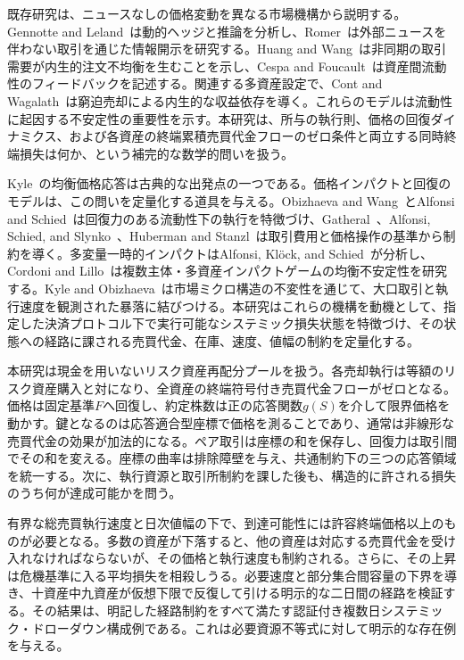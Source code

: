 \documentclass[11pt]{article}
\numberwithin{equation}{section}
\theoremstyle{definition}
\theoremstyle{remark}
\begin{document}
既存研究は、ニュースなしの価格変動を異なる市場機構から説明する。Gennotte and Leland~\citep{GennotteLeland1990}は動的ヘッジと推論を分析し、Romer~\citep{Romer1993}は外部ニュースを伴わない取引を通じた情報開示を研究する。Huang and Wang~\citep{HuangWang2009}は非同期の取引需要が内生的注文不均衡を生むことを示し、Cespa and Foucault~\citep{CespaFoucault2014}は資産間流動性のフィードバックを記述する。関連する多資産設定で、Cont and Wagalath~\citep{ContWagalath2013}は窮迫売却による内生的な収益依存を導く。これらのモデルは流動性に起因する不安定性の重要性を示す。本研究は、所与の執行則、価格の回復ダイナミクス、および各資産の終端累積売買代金フローのゼロ条件と両立する同時終端損失は何か、という補完的な数学的問いを扱う。

Kyle~\citep{Kyle1985}の均衡価格応答は古典的な出発点の一つである。価格インパクトと回復のモデルは、この問いを定量化する道具を与える。Obizhaeva and Wang~\citep{ObizhaevaWang2013}とAlfonsi and Schied~\citep{AlfonsiSchied2010}は回復力のある流動性下の執行を特徴づけ、Gatheral~\citep{Gatheral2010}、Alfonsi, Schied, and Slynko~\citep{AlfonsiSchiedSlynko2012}、Huberman and Stanzl~\citep{HubermanStanzl2004}は取引費用と価格操作の基準から制約を導く。多変量一時的インパクトはAlfonsi, Kl\"ock, and Schied~\citep{AlfonsiKlockSchied2016}が分析し、Cordoni and Lillo~\citep{CordoniLillo2024}は複数主体・多資産インパクトゲームの均衡不安定性を研究する。Kyle and Obizhaeva~\citep{KyleObizhaeva2023}は市場ミクロ構造の不変性を通じて、大口取引と執行速度を観測された暴落に結びつける。本研究はこれらの機構を動機として、指定した決済プロトコル下で実行可能なシステミック損失状態を特徴づけ、その状態への経路に課される売買代金、在庫、速度、値幅の制約を定量化する。

本研究は現金を用いないリスク資産再配分プールを扱う。各売却執行は等額のリスク資産購入と対になり、全資産の終端符号付き売買代金フローがゼロとなる。価格は固定基準$F$へ回復し、約定株数は正の応答関数$g(S)$を介して限界価格を動かす。鍵となるのは応答適合型座標で価格を測ることであり、通常は非線形な売買代金の効果が加法的になる。ペア取引は座標の和を保存し、回復力は取引間でその和を変える。座標の曲率は排除障壁を与え、共通制約下の三つの応答領域を統一する。次に、執行資源と取引所制約を課した後も、構造的に許される損失のうち何が達成可能かを問う。

有界な総売買執行速度と日次値幅の下で、到達可能性には許容終端価格以上のものが必要となる。多数の資産が下落すると、他の資産は対応する売買代金を受け入れなければならないが、その価格と執行速度も制約される。さらに、その上昇は危機基準に入る平均損失を相殺しうる。必要速度と部分集合間容量の下界を導き、十資産中九資産が仮想下限で反復して引ける明示的な二日間の経路を検証する。その結果は、明記した経路制約をすべて満たす認証付き複数日システミック・ドローダウン構成例である。これは必要資源不等式に対して明示的な存在例を与える。
\end{document}
